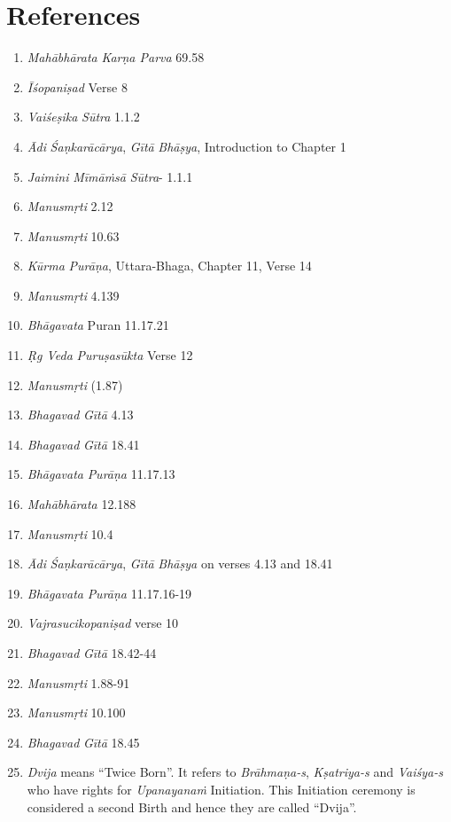 \section*{References}

\begin{enumerate}
\itemsep=0pt
\item
  \emph{Mahābhārata} \emph{Karṇa Parva} 69.58
\item
  \emph{Īśopaniṣad} Verse 8
\item
  \emph{Vaiśeṣika} \emph{Sūtra} 1.1.2
\item
  \emph{Ādi} \emph{Śaṇkarācārya}, \emph{Gītā} \emph{Bhāṣya}, Introduction to Chapter 1
\item
  \emph{Jaimini} \emph{Mīmāṁsā} \emph{Sūtra}- 1.1.1
\item
  \emph{Manusmṛti} 2.12
\item
  \emph{Manusmṛti} 10.63
\item
  \emph{Kūrma} \emph{Purāṇa}, Uttara-Bhaga, Chapter 11, Verse 14
\item
  \emph{Manusmṛti} 4.139
\item
  \emph{Bhāgavata} Puran 11.17.21
\item
  \emph{Ṛg Veda} \emph{Puruṣasūkta} Verse 12
\item
  \emph{Manusmṛti} (1.87)
\item
  \emph{Bhagavad} \emph{Gītā} 4.13
\item
  \emph{Bhagavad} \emph{Gītā} 18.41
\item
  \emph{Bhāgavata} \emph{Purāṇa} 11.17.13
\item
  \emph{Mahābhārata} 12.188
\item
  \emph{Manusmṛti} 10.4
\item
  \emph{Ādi} \emph{Śaṇkarācārya}, \emph{Gītā} \emph{Bhāṣya} on verses 4.13 and 18.41
\item
  \emph{Bhāgavata} \emph{Purāṇa} 11.17.16-19
\item
  \emph{Vajrasucikopaniṣad} verse 10
\item
  \emph{Bhagavad} \emph{Gītā} 18.42-44
\item
  \emph{Manusmṛti} 1.88-91
\item
  \emph{Manusmṛti} 10.100
\item
  \emph{Bhagavad} \emph{Gītā} 18.45
\item
  \emph{Dvija} means ``Twice Born''. It refers to \emph{Brāhmaṇa-s}, \emph{Kṣatriya-s} and \emph{Vaiśya-s} who have rights for \emph{Upanayanaṁ} Initiation. This Initiation ceremony is considered a second Birth and hence they are called ``Dvija''.

\end{enumerate}
